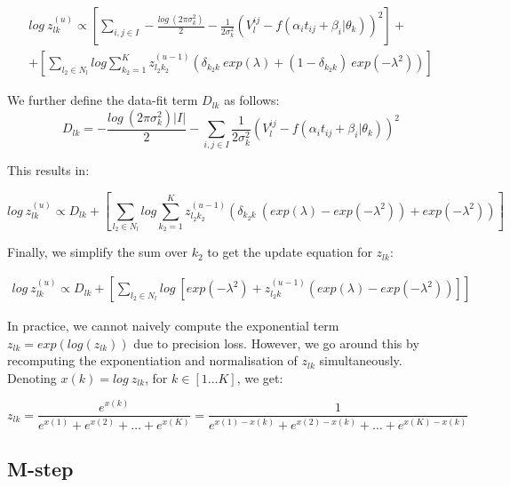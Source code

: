 \begin{multline}
 log\ z_{lk}^{(u)} \propto  \left[ \sum_{i,j \in I} -\frac{log\ (2 \pi \sigma_k^2)}{2} - \frac{1}{2\sigma_k^2}(V_l^{ij} - f(\alpha_i t_{ij} + \beta_i | \theta_k))^2 \right] + \\ + \left[\sum_{l_2 \in N_l} log \sum_{k_2 = 1}^K z_{l_2k_2}^{(u-1)} (\delta_{k_2 k}\ exp(\lambda) + (1 - \delta_{k_2 k})\ exp(-\lambda^2)) \right]
\end{multline}


We further define the data-fit term $D_{lk}$ as follows:
\begin{equation}
\label{eq:app_e-step_Dlk}
D_{lk} = -\frac{log\ (2 \pi \sigma_k^2) |I|}{2} - \sum_{i,j \in I}  \frac{1}{2\sigma_k^2}(V_l^{ij} - f(\alpha_i t_{ij} + \beta_i | \theta_k))^2 
\end{equation}


This results in:

\small
\begin{equation}
 log\ z_{lk}^{(u)} \propto  D_{lk} + \left[\sum_{l_2 \in N_l} log \sum_{k_2 = 1}^K z_{l_2k_2}^{(u-1)} (\delta_{k_2 k}\ (exp(\lambda) - exp(-\lambda^2)) + exp(-\lambda^2)) \right]
\end{equation}
\normalsize


Finally, we simplify the sum over $k_2$ to get the update equation for $z_{lk}$:

\begin{equation}
\label{eq:app_e-step}
\begin{split}
 log\ z_{lk}^{(u)} \propto D_{lk}+ \left[ \sum_{l_2 \in N_l} log\ \left[ exp(-\lambda^2) + z_{l_2k}^{(u-1)} (exp(\lambda) - exp(-\lambda^2)) \right] \right]
\end{split}
\end{equation}

In practice, we cannot naively compute the exponential term $z_{lk} = exp(log(z_{lk}))$ due to precision loss. However, we go around this by recomputing the exponentiation and normalisation of $z_{lk}$ simultaneously. Denoting $x(k) = log\ z_{lk}$, for  $k \in [1 \dots K]$, we get: 

\begin{equation}
 z_{lk}  = \frac{e^{x(k)}}{e^{x(1)}+e^{x(2)} + \dots + e^{x(K)}} = \frac{1}{e^{x(1)-x(k)} +e^{x(2)-x(k)} + \dots + e^{x(K)-x(k)}}
\end{equation}



\subsection{M-step}


